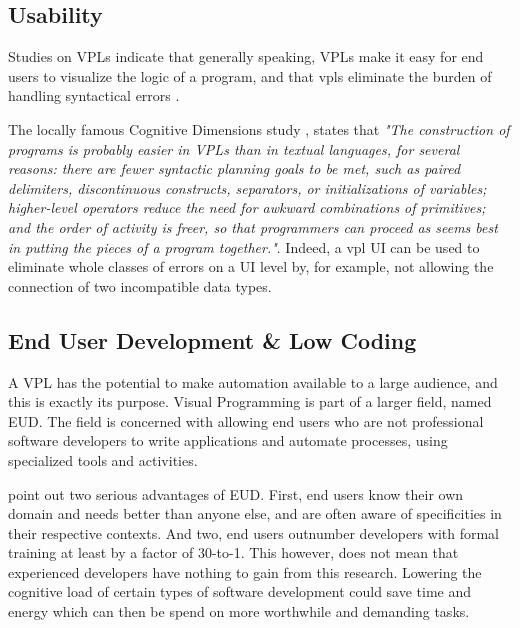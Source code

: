 \subsection{Usability}

Studies on \ac{VPL}s indicate that generally speaking, VPLs make it easy for end users to visualize the logic of a program, and that vpls eliminate the burden of handling syntactical errors \cite{kuhail_characterizing_2021}.

The locally famous Cognitive Dimensions study \cite{green_usability_1996}, states that \emph{"The construction of programs is probably easier in VPLs than in textual languages, for several reasons: 
there are fewer syntactic planning goals to be met, such as paired delimiters, discontinuous constructs, separators, or initializations of variables; 
higher-level operators reduce the need for awkward combinations of primitives; 
and the order of activity is freer, so that programmers can proceed as seems best in putting the pieces of a program together."}. 
Indeed, a vpl UI can be used to eliminate whole classes of errors on a UI level by, for example, not allowing the connection of two incompatible data types. 



\subsection{End User Development \& Low Coding}
A \ac{VPL} has the potential to make automation available to a large audience, and this is exactly its purpose. 
Visual Programming is part of a larger field, named \ac{EUD}. 
The field is concerned with allowing end users who are not professional software developers to write applications and automate processes, using specialized tools and activities. 

\citet{kuhail_characterizing_2021} point out two serious advantages of EUD. 
First, end users know their own domain and needs better than anyone else, and are often aware of specificities in their respective contexts. 
And two, end users outnumber developers with formal training at least by a factor of 30-to-1.
This however, does not mean that experienced developers have nothing to gain from this research. 
Lowering the cognitive load of certain types of software development could save time and energy which can then be spend on more worthwhile and demanding tasks. 

